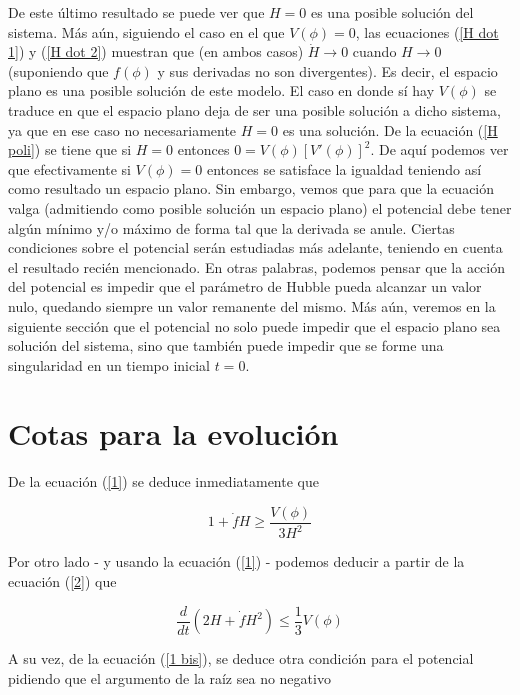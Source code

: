 De este último resultado se puede ver que $H=0$ es una posible solución del sistema. Más aún, siguiendo el caso en el que $V(\phi)=0$, las ecuaciones (\ref{H dot 1}) y (\ref{H dot 2}) muestran que (en ambos casos) $\dot{H}\to 0$ cuando $H\to 0$ (suponiendo que $f(\phi)$ y sus derivadas no son divergentes). Es decir, el espacio plano es una posible solución de este modelo. El caso en donde sí hay $V(\phi)$ se traduce en que el espacio plano deja de ser una posible solución a dicho sistema, ya que en ese caso no necesariamente $H=0$ es una solución. De la ecuación (\ref{H poli}) se tiene que si $H=0$ entonces $0=V(\phi)[V'(\phi)]^2$. De aquí podemos ver que efectivamente si $V(\phi)=0$ entonces se satisface la igualdad teniendo así como resultado un espacio plano. Sin embargo, vemos que para que la ecuación valga (admitiendo como posible solución un espacio plano) el potencial debe tener algún mínimo y/o máximo de forma tal que la derivada se anule. Ciertas condiciones sobre el potencial serán estudiadas más adelante, teniendo en cuenta el resultado recién mencionado. En otras palabras, podemos pensar que la acción del potencial es impedir que el parámetro de Hubble pueda alcanzar un valor nulo, quedando siempre un valor remanente del mismo. Más aún, veremos en la siguiente sección que el potencial no solo puede impedir que el espacio plano sea solución del sistema, sino que también puede impedir que se forme una singularidad en un tiempo inicial $t=0$.




    
\section{Cotas para la evolución} 

De la ecuación (\ref{1}) se deduce inmediatamente que

\begin{equation}\label{V menor}
1+\dot{f}H\geq \frac{V(\phi)}{3H^2}
\end{equation}

Por otro lado - y usando la ecuación (\ref{1}) - podemos deducir a partir de la ecuación (\ref{2}) que 

\begin{equation}\label{V mayor}
\frac{d}{dt}(2H+\dot{f}H^2) \leq \frac{1}{3}V(\phi)
\end{equation}

A su vez, de la ecuación (\ref{1 bis}), se deduce otra condición para el potencial pidiendo que el argumento de la raíz sea no negativo

